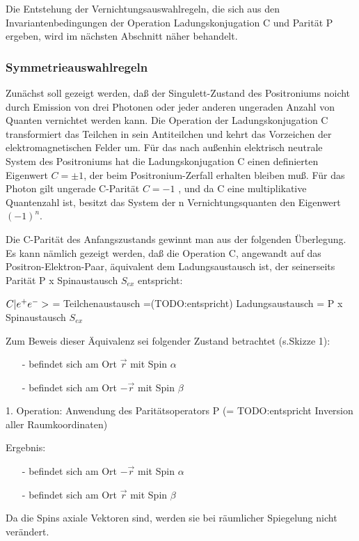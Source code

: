 Die Entstehung der Vernichtungsauswahlregeln, die sich aus den Invariantenbedingungen der Operation Ladungskonjugation C und Parität P ergeben, wird im nächsten Abschnitt näher behandelt.

\subsubsection{Symmetrieauswahlregeln}
Zunächst soll gezeigt werden, daß der Singulett-Zustand des Positroniums noicht durch Emission von drei Photonen oder jeder anderen ungeraden Anzahl von Quanten vernichtet werden kann. Die Operation der Ladungskonjugation C transformiert das Teilchen in sein Antiteilchen und kehrt das Vorzeichen der elektromagnetischen Felder um.
Für das nach außenhin elektrisch neutrale System des Positroniums hat die Ladungskonjugation C einen definierten Eigenwert $C=\pm1$, der beim Positronium-Zerfall erhalten bleiben muß. Für das Photon gilt ungerade C-Parität $C=-1$ , und da C eine multiplikative Quantenzahl ist, besitzt das System der n Vernichtungsquanten den Eigenwert $(-1)^n$.

Die C-Parität des Anfangszustands gewinnt man aus der folgenden Überlegung. Es kann nämlich gezeigt werden, daß die Operation C, angewandt auf das Positron-Elektron-Paar, äquivalent dem Ladungsaustausch ist, der seinerseits Parität P x Spinaustausch $S_{ex}$ entspricht:

$C | e^+ e^- >$ = Teilchenaustausch =(TODO:entspricht) Ladungsaustausch = P x Spinaustausch $S_{ex}$

Zum Beweis dieser Äquivalenz sei folgender Zustand betrachtet (s.Skizze 1):
\begin{itemize}
 \item[-] \elektron befindet sich am Ort $\vec{r}$ mit Spin $\alpha$
 \item[-] \positron befindet sich am Ort $-\vec{r}$ mit Spin $\beta$
\end{itemize}

1. Operation: Anwendung des Paritätsoperators P
 (= TODO:entspricht Inversion aller Raumkoordinaten)

Ergebnis:
\begin{itemize}
 \item[-] \elektron befindet sich am Ort $-\vec{r}$ mit Spin $\alpha$
 \item[-] \positron befindet sich am Ort $\vec{r}$ mit Spin $\beta$
\end{itemize}
Da die Spins axiale Vektoren sind, werden sie bei räumlicher Spiegelung nicht verändert.

